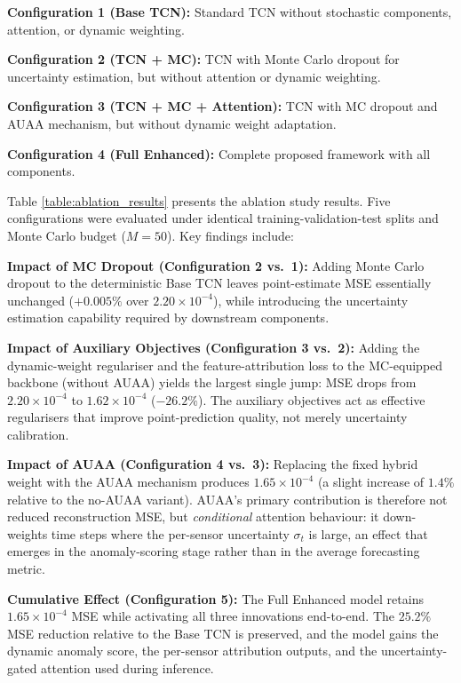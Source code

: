 \textbf{Configuration 1 (Base TCN):} Standard TCN without stochastic components, attention, or dynamic weighting.

\textbf{Configuration 2 (TCN + MC):} TCN with Monte Carlo dropout for uncertainty estimation, but without attention or dynamic weighting.

\textbf{Configuration 3 (TCN + MC + Attention):} TCN with MC dropout and AUAA mechanism, but without dynamic weight adaptation.

\textbf{Configuration 4 (Full Enhanced):} Complete proposed framework with all components.



Table \ref{table:ablation_results} presents the ablation study results. Five configurations were evaluated under identical training-validation-test splits and Monte Carlo budget ($M=50$). Key findings include:

\textbf{Impact of MC Dropout (Configuration 2 vs.\ 1):} Adding Monte Carlo dropout to the deterministic Base TCN leaves point-estimate MSE essentially unchanged ($+0.005\%$ over $2.20\times 10^{-4}$), while introducing the uncertainty estimation capability required by downstream components.

\textbf{Impact of Auxiliary Objectives (Configuration 3 vs.\ 2):} Adding the dynamic-weight regulariser and the feature-attribution loss to the MC-equipped backbone (without AUAA) yields the largest single jump: MSE drops from $2.20\times 10^{-4}$ to $1.62\times 10^{-4}$ ($-26.2\%$). The auxiliary objectives act as effective regularisers that improve point-prediction quality, not merely uncertainty calibration.

\textbf{Impact of AUAA (Configuration 4 vs.\ 3):} Replacing the fixed hybrid weight with the AUAA mechanism produces $1.65\times 10^{-4}$ (a slight increase of $1.4\%$ relative to the no-AUAA variant). AUAA's primary contribution is therefore not reduced reconstruction MSE, but \emph{conditional} attention behaviour: it down-weights time steps where the per-sensor uncertainty $\sigma_t$ is large, an effect that emerges in the anomaly-scoring stage rather than in the average forecasting metric.

\textbf{Cumulative Effect (Configuration 5):} The Full Enhanced model retains $1.65\times 10^{-4}$ MSE while activating all three innovations end-to-end. The $25.2\%$ MSE reduction relative to the Base TCN is preserved, and the model gains the dynamic anomaly score, the per-sensor attribution outputs, and the uncertainty-gated attention used during inference.

